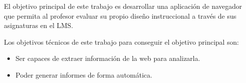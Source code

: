 
El objetivo principal de este trabajo es desarrollar una aplicación de navegador
que permita al profesor evaluar su propio diseño instruccional a través de sus asignaturas en el LMS.

Los objetivos técnicos de este trabajo para conseguir el objetivo principal son:
\begin{itemize}
	\item Ser capaces de extraer información de la web para analizarla.
	\item Poder generar informes de forma automática.
\end{itemize}
